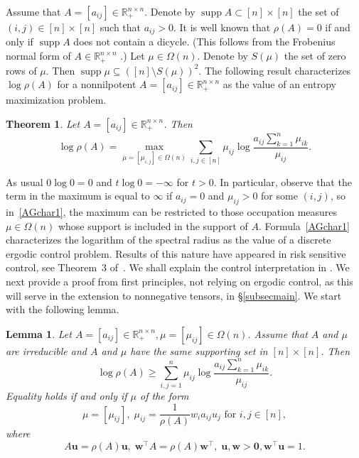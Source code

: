 \documentclass{amsart}
\newcommand{\supp}[1]{\operatorname{supp}{#1}}
\newcommand{\R}{\mathbb{R}}
\newcommand{\uu}{\mathbf{u}}
\newcommand{\w}{\mathbf{w}}
\newcommand{\0}{\mathbf{0}}
\newcommand{\1}{\mathbf{1}}
\newcommand{\trans}{^\top}
\newtheorem{theorem}[theo]{Theorem}
\newtheorem{lemma}[theo]{Lemma}
\theoremstyle{remark}
\numberwithin{equation}{section} %
\renewcommand{\ge}{\geqslant}
\begin{document}
Assume that $A=[a_{ij}]\in\R_+^{n\times n}$.
%
Denote by $\supp{A}\subset [n]\times [n]$ the set of $(i,j)\in [n]\times [n]$ such that $a_{ij}>0$. It is well known that  $\rho(A)=0$
if and only if $\supp{A}$ does not contain a dicycle.  (This follows from the Frobenius normal form of $A\in\R_{+}^{n\times n}$ \cite[Theorem 6.4.4]{Fribook}.)  Let $\mu\in \Omega(n)$.  Denote by $S(\mu)$ the set of zero rows of $\mu$.  Then $\supp{\mu}\subseteq ([n]\setminus S(\mu))^2$.
The following result characterizes $\log\rho(A)$ for a nonnilpotent $A=[a_{ij}]\in\R_+^{n\times n}$ as the value of an entropy maximization problem.
\begin{theorem}\label{AGchar}  Let $A=[a_{ij}]\in\R_+^{n\times n}$.  Then
\begin{equation}\label{AGchar1}
\log\rho(A)=\max_{\mu=[\mu_{i,j}]\in\Omega(n)} \sum_{i,j\in[n]} \mu_{ij}\log \frac{a_{ij}\sum_{k=1}^n \mu_{ik}}{\mu_{ij}}.
\end{equation}
\end{theorem}
As usual $0\log 0=0$ and $t\log 0=-\infty$ for $t>0$. In particular, observe
that the term in the maximum is equal to $\infty$ if $a_{ij}=0$ and $\mu_{ij}>0$ for some $(i,j)$, so in~\eqref{AGchar1}, the maximum can be restricted
to those occupation measures $\mu\in \Omega(n)$ whose support is included
in the support of $A$.
%
%
%
%
Formula~\eqref{AGchar1} characterizes the logarithm of the spectral radius
as the value of a discrete ergodic control problem. Results
of this nature have appeared in risk sensitive control,
see Theorem~3 of~\cite{AB17}.
%
We shall explain the control interpretation in . 
%
We next provide a proof from first principles, not relying on ergodic control,
as this will serve in the extension to nonnegative tensors, in \S\ref{subsecmain}.
%
We start with the following lemma.
\begin{lemma}\label{auxlemAG}  Let $A=[a_{ij}]\in\R_+^{n\times n}, \mu=[\mu_{ij}]\in\Omega(n)$.  Assume that $A$ and $\mu$ are irreducible and $A$ and $\mu$ have the same supporting set in $[n]\times [n]$.  Then
\begin{equation}\label{auxlemAG1}
\log\rho(A)\ge \sum_{i,j=1}^n \mu_{ij}\log \frac{a_{ij}\sum_{k=1}^n \mu_{ik}}{\mu_{ij}}.
\end{equation}
Equality holds if and only if $\mu$ of the form 
\begin{equation}\label{maxmu}
\mu=[\mu_{ij}], \;\mu_{ij}=\frac{1}{\rho(A)} w_ia_{ij}u_j \textrm{ for } i,j\in[n], 
\end{equation}
where 
\[A\uu=\rho(A)\uu,\; \w\trans A=\rho(A)\w\trans,\;\uu,\w>\0, \w\trans\uu=1.\]
\end{lemma}
\end{document}
